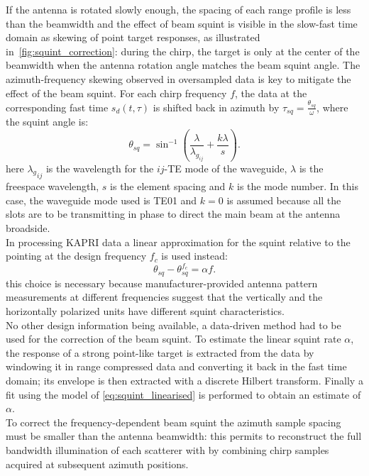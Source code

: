 If the antenna is rotated slowly enough,  the spacing of each range profile is less than the beamwidth and the effect of beam squint is visible in the slow-fast time domain as skewing of point target responses, as illustrated in~\autoref{fig:squint_correction}: during the chirp, the target is only at the center of the beamwidth when the antenna rotation angle matches the beam squint angle. 
The azimuth-frequency skewing observed in oversampled data is key to mitigate the effect of the beam squint. For each chirp frequency $f$, the data at the corresponding fast time $s_{d}\left(t,\tau\right)$ is shifted back in azimuth by $\tau_{sq}=\frac{\theta_{sq}}{\omega}$, where the squint angle is:
\begin{equation}\label{eq:squint_exact}
	\theta_{sq} = \sin^{-1}\left(\frac{\lambda}{\lambda_{g_{ij}}} + \frac{k \lambda}{s}\right).
\end{equation}
here ${\lambda_g}_{ij}$ is the wavelength for the $ij$-TE mode of the waveguide, $\lambda$ is the freespace wavelength, $s$ is the element spacing and $k$ is the mode number. In this case, the waveguide mode used is TE01 and $k=0$ is assumed because all the slots are to be transmitting in phase\cite{kraus88} to direct the main beam at the antenna broadside.\\
In processing KAPRI data a linear approximation for the squint relative to the pointing at the design frequency $f_c$ is used instead:
\begin{equation}\label{eq:squint_linearised}
	\theta_{sq} - \theta_{sq}^{f_{c}}  =  \alpha f.
\end{equation}
this choice is necessary because manufacturer-provided antenna pattern measurements at different frequencies suggest that the vertically and the horizontally polarized units have different squint characteristics.\\ No other design information being available, a data-driven method had to be used for the correction of the beam squint. To estimate the linear squint rate $\alpha$, the response of a strong point-like target is extracted from the data by windowing it in range compressed data and converting it back in the fast time domain; its envelope is then extracted with a discrete Hilbert transform. Finally a fit using the model of \autoref{eq:squint_linearised} is performed to obtain an estimate of $\alpha$.\\
To correct the frequency-dependent beam squint the azimuth sample spacing must be smaller than the antenna beamwidth: this permits to reconstruct the full bandwidth illumination of each scatterer with by combining chirp samples acquired at subsequent azimuth positions.
